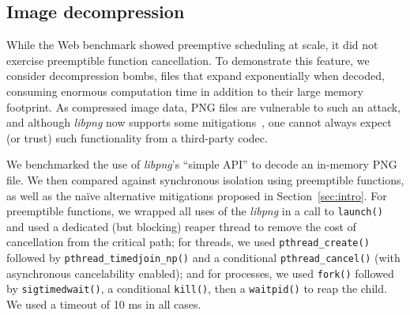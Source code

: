 

\subsection{Image decompression}

While the Web benchmark showed preemptive scheduling at scale, it did not exercise
preemptible function cancellation.  To demonstrate this feature, we consider
decompression bombs, files that expand exponentially when decoded, consuming enormous
computation time in addition to their large memory footprint.  As compressed image
data, PNG files are vulnerable to such an attack, and although \textit{libpng} now
supports some mitigations~\cite{www-libpng-bombs}, one cannot always expect (or
trust) such functionality from a third-party codec.

We benchmarked the use of \textit{libpng}'s ``simple API'' to decode an in-memory PNG
file.  We then compared against synchronous isolation using preemptible functions, as
well as the na\"ive alternative mitigations proposed in Section~\ref{sec:intro}.  For
preemptible functions, we wrapped all uses of the \textit{libpng} in a call to
\texttt{launch()} and used a dedicated (but blocking) reaper thread to remove the
cost of cancellation from the critical path; for threads, we used
\texttt{pthread\_create()} followed by \texttt{pthread\_timedjoin\_np()} and a
conditional \texttt{pthread\_cancel()} (with asynchronous cancelability enabled); and
for processes, we used \texttt{fork()} followed by \texttt{sigtimedwait()}, a
conditional \texttt{kill()}, then a \texttt{waitpid()} to reap the child.  We used a
timeout of 10 ms in all cases.

